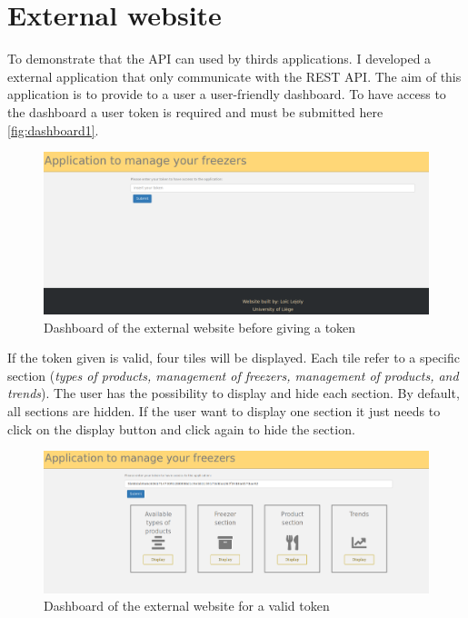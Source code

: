 \section{External website}
To demonstrate that the API can used by thirds applications. I developed a external application that only communicate with the REST API. The aim of this application is to provide to a user a user-friendly dashboard. To have access to the dashboard a user token is required and must be submitted here \autoref{fig:dashboard1}.

\begin{figure}[H]
\centering
\includegraphics[scale=0.25]{./images/dashboard1.png}
\caption{Dashboard of the external website before giving a token}
\label{fig:dashboard1}
\end{figure}

If the token given is valid, four tiles will be displayed. Each tile refer to a specific section (\textit{types of products, management of freezers, management of products, and trends}). The user has the possibility to display and hide each section. By default, all sections are hidden. If the user want to display one section it just needs to click on the display button and click again to hide the section.

\begin{figure}[H]
\centering
\includegraphics[scale=0.25]{./images/dashboard2.png}
\caption{Dashboard of the external website for a valid token}
\label{fig:dashboard2}
\end{figure}

